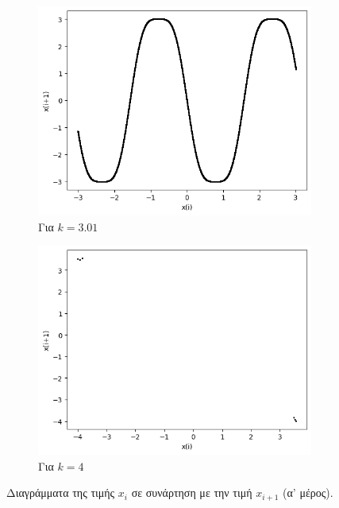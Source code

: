 \begin{figure}[ht]
\begin{subfigure}[b]{0.4\textwidth}
		\includegraphics[width=\textwidth]{LateX images/sine q=-0.5/g20}
		\caption{Για $k=3.01$}
		\label{f:k131}
	\end{subfigure}
	\hfill
		\begin{subfigure}[b]{0.4\textwidth}
		\centering
		\includegraphics[width=\textwidth]{LateX images/sine q=-0.5/g21}
		\caption{Για $k=4$}
		\label{f:k132}
	\end{subfigure}
	\hfill			
	\caption{Διαγράμματα της τιμής \(x_i\) σε συνάρτηση με την τιμή \(x_{i+1}\) (α' μέρος).}
	\label{f:g58}
\end{figure}

\clearpage